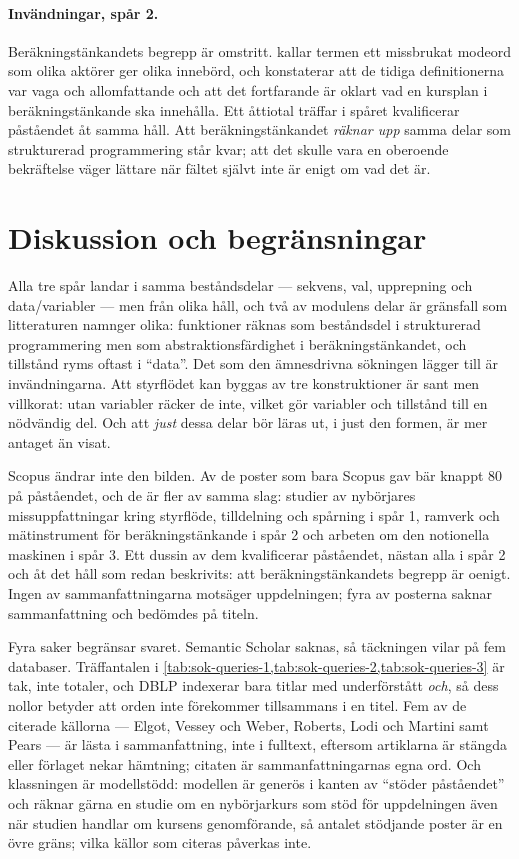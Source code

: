 \paragraph{Invändningar, spår 2.}  Beräkningstänkandets begrepp är
omstritt.  \textcite{lodiMartini2021} kallar termen ett missbrukat
modeord som olika aktörer ger olika innebörd, och
\textcite{pears2021} konstaterar att de tidiga definitionerna var vaga
och allomfattande och att det fortfarande är oklart vad en kursplan i
beräkningstänkande ska innehålla.  Ett åttiotal träffar i spåret
kvalificerar påståendet åt samma håll.  Att beräkningstänkandet
\emph{räknar upp} samma delar som strukturerad programmering står kvar;
att det skulle vara en oberoende bekräftelse väger lättare när fältet
självt inte är enigt om vad det är.

\section{Diskussion och begränsningar}
\label{sec:sok-diskussion}

Alla tre spår landar i samma beståndsdelar --- sekvens, val, upprepning
och data/variabler --- men från olika håll, och två av modulens delar är
gränsfall som litteraturen namnger olika: funktioner räknas som
beståndsdel i strukturerad programmering men som abstraktionsfärdighet i
beräkningstänkandet, och tillstånd ryms oftast i \enquote{data}.  Det som
den ämnesdrivna sökningen lägger till är invändningarna.  Att styrflödet
kan byggas av tre konstruktioner är sant men villkorat: utan variabler
räcker de inte, vilket gör variabler och tillstånd till en nödvändig del.
Och att \emph{just} dessa delar bör läras ut, i just den formen, är mer
antaget än visat.

Scopus ändrar inte den bilden.  Av de poster som bara Scopus gav bär
knappt 80 på påståendet, och de är fler av samma slag: studier av
nybörjares missuppfattningar kring styrflöde, tilldelning och spårning i
spår 1, ramverk och mätinstrument för beräkningstänkande i spår 2 och
arbeten om den notionella maskinen i spår 3.  Ett dussin av dem
kvalificerar påståendet, nästan alla i spår 2 och åt det håll som redan
beskrivits: att beräkningstänkandets begrepp är oenigt.  Ingen av
sammanfattningarna motsäger uppdelningen; fyra av posterna saknar
sammanfattning och bedömdes på titeln.

Fyra saker begränsar svaret.  Semantic Scholar saknas, så täckningen
vilar på fem databaser.  Träffantalen i
\cref{tab:sok-queries-1,tab:sok-queries-2,tab:sok-queries-3} är tak,
inte totaler, och DBLP
indexerar bara titlar med underförstått
\emph{och}, så dess nollor betyder att orden inte förekommer tillsammans
i en titel.  Fem av de citerade källorna --- Elgot, Vessey och Weber,
Roberts, Lodi och Martini samt Pears --- är lästa i sammanfattning, inte
i fulltext, eftersom artiklarna är stängda eller förlaget nekar hämtning;
citaten är sammanfattningarnas egna ord.  Och klassningen är modellstödd: modellen
är generös i kanten av \enquote{stöder påståendet} och räknar gärna en
studie om en nybörjarkurs som stöd för uppdelningen även när studien
handlar om kursens genomförande, så antalet stödjande poster är en
övre gräns; vilka källor som citeras påverkas inte.

